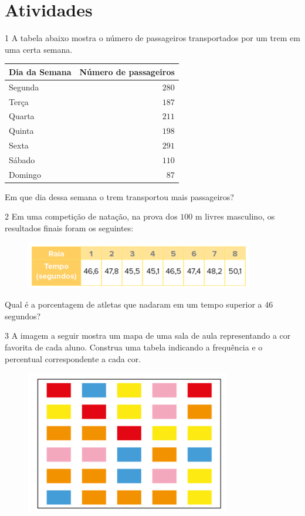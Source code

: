 \section{Atividades}

\num{1}  A tabela abaixo mostra o número de passageiros transportados por um
trem em uma certa semana.



\begin{table}[h]\centering
\begin{tabular}[]{lr}
\toprule
Dia da Semana & Número de passageiros\\
\midrule
Segunda & $280$\\
Terça & $187$\\
Quarta & $211$\\
Quinta & $198$\\
Sexta & $291$\\
Sábado & $110$\\
Domingo & $87$\\
\bottomrule
\end{tabular}
\end{table}

Em que dia dessa semana o trem transportou mais passageiros?


\num{2}  Em uma competição de natação, na prova dos $100$ m livres masculino, os
resultados finais foram os seguintes:

\begin{figure}[h]
\centering\includegraphics[width=3.92708in,height=0.8125in]{./imgSAEB_6_MAT/media/image81.png}
\end{figure}

Qual é a porcentagem de atletas que nadaram em um tempo superior a $46$
segundos?


\num{3}  A imagem a seguir mostra um mapa de uma sala de aula representando a
cor favorita de cada aluno. Construa uma tabela indicando a frequência e
o percentual correspondente a cada cor.

\begin{figure}[h]
\centering\includegraphics[width=3.52292in,height=2.45347in]{./imgSAEB_6_MAT/media/image82.png}
\end{figure}


